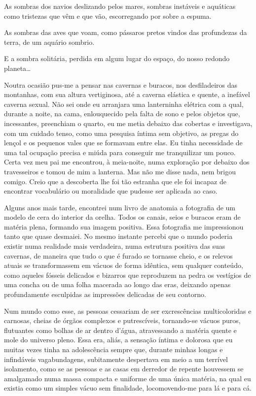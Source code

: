 As sombras dos navios deslizando pelos mares, sombras instáveis e aquáticas como tristezas que vêm e que vão, escorregando por sobre a espuma.

As sombras das aves que voam, como pássaros pretos vindos das profundezas da terra, de um aquário sombrio.

E a sombra solitária, perdida em algum lugar do espaço, do nosso redondo planeta\ldots{}

Noutra ocasião pus-me a pensar nas cavernas e buracos, nos desfiladeiros das montanhas, com sua altura vertiginosa, até a caverna elástica e quente, a inefável caverna sexual. Não sei onde eu arranjara uma lanterninha elétrica com a qual, durante a noite, na cama, enlouquecido pela falta de sono e pelos objetos que, incessantes, preenchiam o quarto, eu me metia debaixo das cobertas e investigava, com um cuidado tenso, como uma pesquisa íntima sem objetivo, as pregas do lençol e os pequenos vales que se formavam entre elas. Eu tinha necessidade de uma tal ocupação precisa e miúda para conseguir me tranquilizar um pouco. Certa vez meu pai me encontrou, à meia-noite, numa exploração por debaixo dos travesseiros e tomou de mim a lanterna. Mas não me disse nada, nem brigou comigo. Creio que a descoberta lhe foi tão estranha que ele foi incapaz de encontrar vocabulário ou moralidade que pudesse ser aplicada ao caso.

Alguns anos mais tarde, encontrei num livro de anatomia a fotografia de um modelo de cera do interior da orelha. Todos os canais, seios e buracos eram de matéria plena, formando sua imagem positiva. Essa fotografia me impressionou tanto que quase desmaiei. No mesmo instante percebi que o mundo poderia existir numa realidade mais verdadeira, numa estrutura positiva das suas cavernas, de maneira que tudo o que é furado se tornasse cheio, e os relevos atuais se transformassem em vácuos de forma idêntica, sem qualquer conteúdo, como aqueles fósseis delicados e bizarros que reproduzem na pedra os vestígios de uma concha ou de uma folha macerada ao longo das eras, deixando apenas profundamente esculpidas as impressões delicadas de seu contorno.

Num mundo como esse, as pessoas cessariam de ser excrescências multicoloridas e carnosas, cheias de órgãos complexos e putrescíveis, tornando-se vácuos puros, flutuantes como bolhas de ar dentro d'água, atravessando a matéria quente e mole do universo pleno. Essa era, aliás, a sensação íntima e dolorosa que eu muitas vezes tinha na adolescência sempre que, durante minhas longas e infindáveis vagabundagens, subitamente despertava em meio a um terrível isolamento, como se as pessoas e as casas em derredor de repente houvessem se amalgamado numa massa compacta e uniforme de uma única matéria, na qual eu existia como um simples vácuo sem finalidade, locomovendo-me para lá e para cá.



